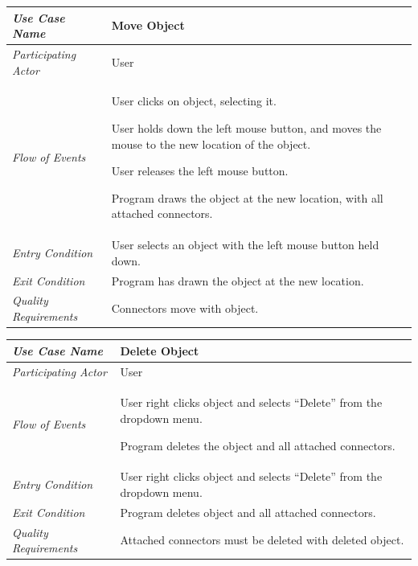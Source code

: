 \documentclass[twoside,letterpaper]{article}
\newenvironment{my_enumerate}{
\begin{enumerate}
  \setlength{\itemsep}{1pt}
  \setlength{\parskip}{0pt}
  \setlength{\parsep}{0pt}}{\end{enumerate}
}
\begin{document}
\begin{flushleft}
\tablehead{}
\begin{tabular}{|m{2.0in} m{5.0in}|}
\hline
{\bfseries\emph{Use Case Name}}
& {\bfseries Move Object}
\\\hline
\emph{Participating Actor}
& User
\\\hline
\emph{Flow of Events}
& \begin{my_enumerate}
\item User clicks on object, selecting it.
\item User holds down the left mouse button, and moves the mouse to the new location of the object.
\item User releases the left mouse button.
\item Program draws the object at the new location, with all attached connectors. 
\end{my_enumerate}
\\\hline
\emph{Entry Condition}
& User selects an object with the left mouse button held down.
\\\hline
\emph{Exit Condition}
& Program has drawn the object at the new location.
\\\hline
\emph{Quality Requirements}
& Connectors move with object. 
\\\hline
\end{tabular}
\end{flushleft}
\bigskip


\begin{flushleft}
\tablehead{}
\begin{tabular}{|m{2.0in} m{5.0in}|}
\hline
{\bfseries\emph{Use Case Name}}
& {\bfseries Delete Object}
\\\hline
\emph{Participating Actor}
& User
\\\hline
\emph{Flow of Events}
& \begin{my_enumerate}
\item User right clicks object and selects ``Delete'' from the dropdown menu.
\item Program deletes the object and all attached connectors. 
\end{my_enumerate}
\\\hline
\emph{Entry Condition}
& User right clicks object and selects ``Delete'' from the dropdown menu.
\\\hline
\emph{Exit Condition}
& Program deletes object and all attached connectors.
\\\hline
\emph{Quality Requirements}
& Attached connectors must be deleted with deleted object. 
\\\hline
\end{tabular}
\end{flushleft}
\bigskip
\end{document}
